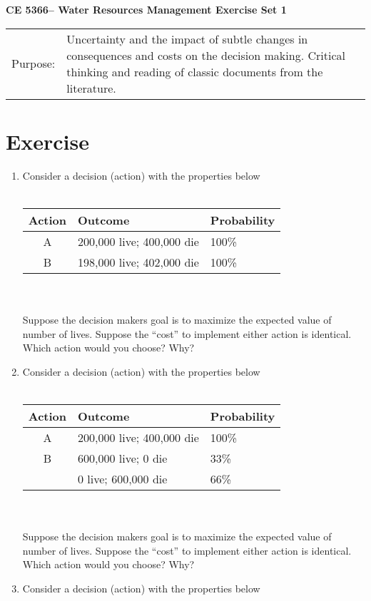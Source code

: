 \documentclass[12pt]{article}
\begin{document}
\begin{center}
{\textbf{{ CE 5366-- Water Resources Management}  {Exercise Set 1}}}
\end{center}
\begingroup
\begin{tabular}{p{1in} p{5in}}
Purpose: & Uncertainty and the impact of subtle changes in consequences and costs on the decision making. Critical thinking and reading of classic documents from the literature. \\
\end{tabular}
\endgroup
\section*{\small{Exercise}}
\begin{enumerate}
\item Consider a decision (action) with the properties below \\ ~\\
\begin{tabular}{cll}
Action & Outcome & Probability \\
\hline
\hline
A & 200,000 live; 400,000 die & 100\% \\
B & 198,000 live; 402,000 die & 100\% \\
\end{tabular}\\~\\
Suppose the decision makers goal is to maximize the expected value of number of lives.
Suppose the ``cost'' to implement either action is identical.
Which action would you choose? Why?
\item Consider a decision (action) with the properties below \\ ~\\
\begin{tabular}{cll}
Action & Outcome & Probability \\
\hline
\hline
A & 200,000 live; 400,000 die & 100\% \\
B & 600,000 live; 0 die & 33\% \\
~ & 0 live; 600,000 die & 66\% \\
\end{tabular}\\~\\
Suppose the decision makers goal is to maximize the expected value of number of lives.
Suppose the ``cost'' to implement either action is identical.
Which action would you choose? Why?
\item Consider a decision (action) with the properties below \\ ~\\

\end{enumerate}
\end{document}
